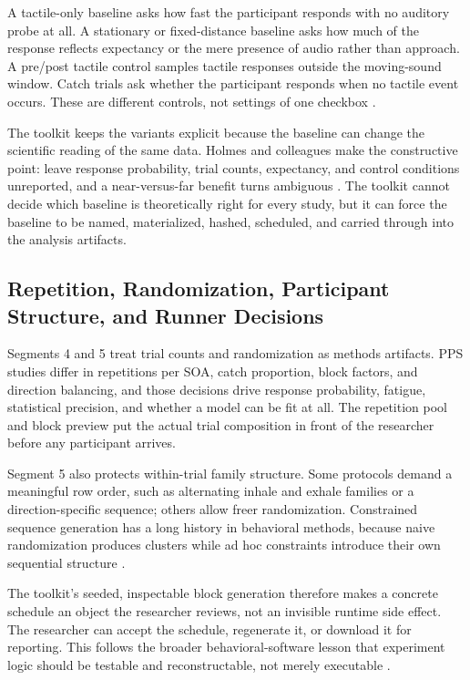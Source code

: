 \documentclass[pdflatex,sn-apa]{sn-jnl}
\begin{document}
A tactile-only baseline asks how fast the participant responds with no auditory probe at all. A stationary or fixed-distance baseline asks how much of the response reflects expectancy or the mere presence of audio rather than approach. A pre/post tactile control samples tactile responses outside the moving-sound window. Catch trials ask whether the participant responds when no tactile event occurs. These are different controls, not settings of one checkbox \citep{Canzoneri2012,Hobeika2019,Teraoka2024,Holmes2020}.

The toolkit keeps the variants explicit because the baseline can change the scientific reading of the same data. Holmes and colleagues make the constructive point: leave response probability, trial counts, expectancy, and control conditions unreported, and a near-versus-far benefit turns ambiguous \citep{Holmes2020}. The toolkit cannot decide which baseline is theoretically right for every study, but it can force the baseline to be named, materialized, hashed, scheduled, and carried through into the analysis artifacts.

\subsection{Repetition, Randomization, Participant Structure, and Runner Decisions}

Segments 4 and 5 treat trial counts and randomization as methods artifacts. PPS studies differ in repetitions per SOA, catch proportion, block factors, and direction balancing, and those decisions drive response probability, fatigue, statistical precision, and whether a model can be fit at all. The repetition pool and block preview put the actual trial composition in front of the researcher before any participant arrives.

Segment 5 also protects within-trial family structure. Some protocols demand a meaningful row order, such as alternating inhale and exhale families or a direction-specific sequence; others allow freer randomization. Constrained sequence generation has a long history in behavioral methods, because naive randomization produces clusters while ad hoc constraints introduce their own sequential structure \citep{Jadoul2023,French2009}.

The toolkit's seeded, inspectable block generation therefore makes a concrete schedule an object the researcher reviews, not an invisible runtime side effect. The researcher can accept the schedule, regenerate it, or download it for reporting. This follows the broader behavioral-software lesson that experiment logic should be testable and reconstructable, not merely executable \citep{DeLeeuw2022,Ellis2024}.
\end{document}

